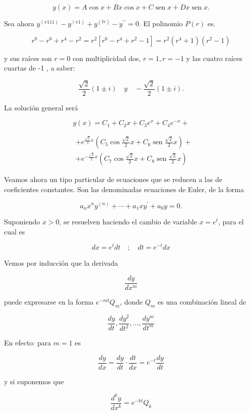 \documentclass[10pt]{article}
\theoremstyle{plain}
\theoremstyle{definition}
\theoremstyle{remark}
\begin{document}
$$
y(x)=A \cos x+B x \cos x+C \operatorname{sen} x+D x \operatorname{sen} x .
$$

Sea ahora $y^{(\mathrm{v} 111)}-y^{(\mathrm{v} 1)}+y^{(\mathrm{iv})}-y^{\prime \prime}=0$. El polinomio $P(r)$ es.

$$
r^{8}-r^{6}+r^{4}-r^{2}=r^{2}\left[r^{6}-r^{4}+r^{2}-1\right]=r^{2}\left(r^{4}+1\right)\left(r^{2}-1\right)
$$

y sus raíces son $r=0$ con multiplicidad dos, $r=1, r=-1$ y las cuatro raíces cuartas de -1 , a saber:

$$
\frac{\sqrt{2}}{2}(1 \pm i) \quad y \quad-\frac{\sqrt{2}}{2}(1 \pm i) .
$$

La solución general será

$$
y(x)=C_{1}+C_{2} x+C_{3} e^{x}+C_{4} e^{-x}+
$$


$$
\begin{aligned}
& +e^{\frac{\sqrt{2}}{2} x}\left(C_{5} \cos \frac{\sqrt{2}}{2} x+C_{6} \operatorname{sen} \frac{\sqrt{2}}{2} x\right)+ \\
& +e^{-\frac{\sqrt{2}}{2} x}\left(C_{7} \cos \frac{\sqrt{2}}{2} x+C_{8} \operatorname{sen} \frac{\sqrt{2}}{2} x\right)
\end{aligned}
$$

Veamos ahora un tipo particular de ecuaciones que se reducen a las de coeficientes constantes. Son las denominadas ecuaciones de Euler, de la forma


\begin{equation*}
a_{n} x^{n} y^{(n)}+\cdots+a_{1} x y^{\prime}+a_{0} y=0 . \tag{5-7}
\end{equation*}


Suponiendo $x>0$, se resuelven haciendo el cambio de variable $x=e^{t}$, para el cual es

$$
d x=e^{t} d t \quad ; \quad d t=e^{-t} d x
$$

Vemos por inducción que la derivada

$$
\frac{d y}{d x^{m}}
$$

puede expresarse en la forma $e^{-m t} Q_{m}$, donde $Q_{m}$ es una combinación lineal de

$$
\frac{d y}{d t}, \frac{d y^{2}}{d t^{2}}, \ldots, \frac{d y^{m}}{d t^{m}}
$$

En efecto: para $m=1$ es

$$
\frac{d y}{d x}=\frac{d y}{d t} \cdot \frac{d t}{d x}=e^{-t} \frac{d y}{d t}
$$

y si suponemos que

$$
\frac{d^{k} y}{d x^{k}}=e^{-k t} Q_{k}
$$
\end{document}
